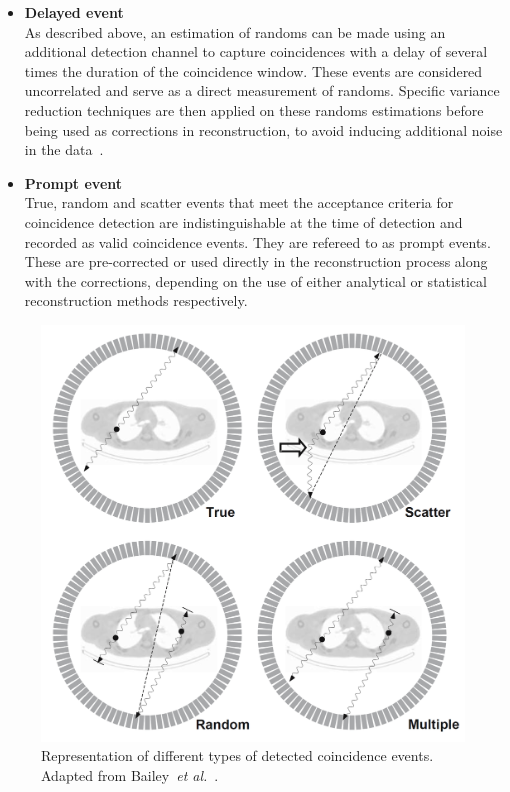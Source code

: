 \begin{itemize}
%
\item\textbf{Delayed event}\\
As described above, an estimation of randoms can be made using an additional detection channel to capture coincidences with a delay of several times the duration of the coincidence window. These events are considered uncorrelated and serve as a direct measurement of randoms. Specific variance reduction techniques are then applied on these randoms estimations before being used as corrections in reconstruction, to avoid inducing additional noise in the data~\cite{Bailey2005}.
%
\item\textbf{Prompt event}\\
True, random and scatter events that meet the acceptance criteria for coincidence detection are indistinguishable at the time of detection and recorded as valid coincidence events. They are refereed to as prompt events.
These are pre-corrected or used directly in the reconstruction process along with the corrections, depending on the use of either analytical or statistical reconstruction methods respectively.
\end{itemize}
%
\begin{figure} [h!]
\centering
\includegraphics[scale=0.22,angle=0]{2_Theory_Methods/figures/Bailey_Scatter_Random_events.png}
\caption{Representation of different types of detected coincidence events. Adapted from Bailey~\textit{et al.}~\cite{Bailey2005}.} 
\label{fig_2:EventsIlustration}
\end{figure} 
%
%
